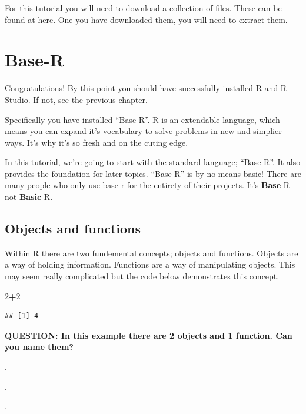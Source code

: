 \documentclass[]{book}
\newenvironment{Shaded}{\begin{snugshade}}{\end{snugshade}}
\newcommand{\DecValTok}[1]{\textcolor[rgb]{0.00,0.00,0.81}{#1}}
\newcommand{\OperatorTok}[1]{\textcolor[rgb]{0.81,0.36,0.00}{\textbf{#1}}}
\begin{document}
For this tutorial you will need to download a collection of files. These can be found at \href{https://stats4sd.org/download/online-r-course_2019-05-14_13:50:11/2019-06-05_12:58:35_data.zip/Data.zip}{here}. One you have downloaded them, you will need to extract them.

\hypertarget{base-r}{%
\chapter{Base-R}\label{base-r}}

Congratulations! By this point you should have successfully installed R and R Studio. If not, see the previous chapter.

Specifically you have installed ``Base-R''. R is an extendable language, which means you can expand it's vocabulary to solve problems in new and simplier ways. It's why it's so fresh and on the cuting edge.

In this tutorial, we're going to start with the standard language; ``Base-R''. It also provides the foundation for later topics. ``Base-R'' is by no means basic! There are many people who only use base-r for the entirety of their projects. It's \textbf{Base}-R not \textbf{Basic}-R.

\hypertarget{objects-and-functions}{%
\section{Objects and functions}\label{objects-and-functions}}

Within R there are two fundemental concepts; objects and functions. Objects are a way of holding information. Functions are a way of manipulating objects. This may seem really complicated but the code below demonstrates this concept.

\begin{Shaded}
\begin{Highlighting}[]
\DecValTok{2}\OperatorTok{+}\DecValTok{2}
\end{Highlighting}
\end{Shaded}

\begin{verbatim}
## [1] 4
\end{verbatim}

\textbf{QUESTION: In this example there are 2 objects and 1 function. Can you name them?}

.

.

.
\end{document}
